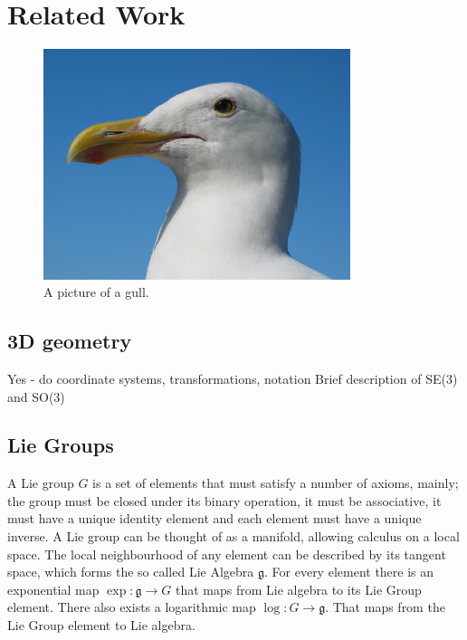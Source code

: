 
\chapter{Related Work}
\label{chapter:Related_Work}

\begin{figure}[h!]
  \centering
    \includegraphics[width=0.8\textwidth]{chapters/images/gull}
  \caption{A picture of a gull.}
\end{figure}

\section{3D geometry}

Yes  - do coordinate systems, transformations, notation
Brief description of SE(3) and SO(3)

\section{Lie Groups}
\label{sec:lie_group}

A Lie group $G$ is a set of elements that must satisfy a number of axioms, mainly; the group must be closed under its binary operation, it must be associative, it must have a unique identity element and each element must have a unique inverse.  A Lie group can be thought of as a manifold, allowing calculus on a local space.  The local neighbourhood of any element can be described by its tangent space, which forms the so called Lie Algebra $\mathfrak g$.  For every element there is an exponential map $\exp\colon \mathfrak g \to G$ that maps from Lie algebra to its Lie Group element.  There also exists a logarithmic map $\log\colon G \to \mathfrak g$.  That maps from the Lie Group element to Lie algebra.

